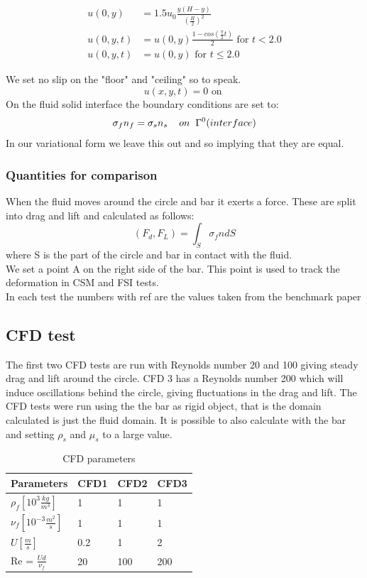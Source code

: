 \begin{align*}
u(0,y) &= 1.5u_0 \frac{y(H-y)}{(\frac{H}{2})^2}  \\
u(0,y,t) &= u(0,y)\frac{1-cos(\frac{\pi}{2}t)}{2} \text{  for  } t<2.0 \\
u(0,y,t) &= u(0,y) \text{  for  } t \leq 2.0
\end{align*}

We set no slip on the "floor" and "ceiling" so to speak.\\
$$ u(x,y,t) = 0 \text{  on  }  $$
On the fluid solid interface the boundary conditions are set to:
$$  \sigma_f n_f = \sigma_s n_s \hspace{4mm} on  \hspace{2mm}\Gamma^0 (interface)   $$
In our variational form we leave this out and so implying that they are equal.

\subsubsection*{Quantities for comparison}
When the fluid moves around the circle and bar it exerts a force. These are split into drag and lift and calculated as follows:
$$ (F_d, F_L) = \int_S \sigma_f n dS $$ 
where S is the part of the circle and bar in contact with the fluid. \\
We set a point A on the right side of the bar. This point is used to track the deformation in CSM and FSI tests. \\
In each test the numbers with ref are the values taken from the benchmark paper \cite{Hron2006a}

\subsection*{CFD test}
The first two CFD tests are run with Reynolds number 20 and 100 giving steady drag and lift around the circle. CFD 3 has a Reynolds number 200 which will induce oscillations behind the circle, giving fluctuations in the drag and lift.
The CFD tests were run using the the bar as rigid object, that is the domain calculated is just the fluid domain. It is possible to also calculate with the bar and setting $\rho_s$ and $\mu_s$ to a large value. 

\begin{table}[h!]
\centering
\caption{CFD parameters}
\label{my-label}
\begin{tabular}{|l|l|l|l|}
\hline
Parameters & CFD1 & CFD2 & CFD3 \\ \hline
$\rho_f [10^3 \frac{kg}{m^3}]$ & 1 & 1 & 1 \\ \hline
$\nu_f [10^{-3} \frac{m^2}{s}]$ & 1 & 1 & 1 \\ \hline
$ U [\frac{m}{s}] $ & 0.2 & 1 & 2 \\ \hline
Re = $\frac{Ud}{\nu_f}$ & 20 & 100 & 200 \\ \hline
\end{tabular}
\end{table}

